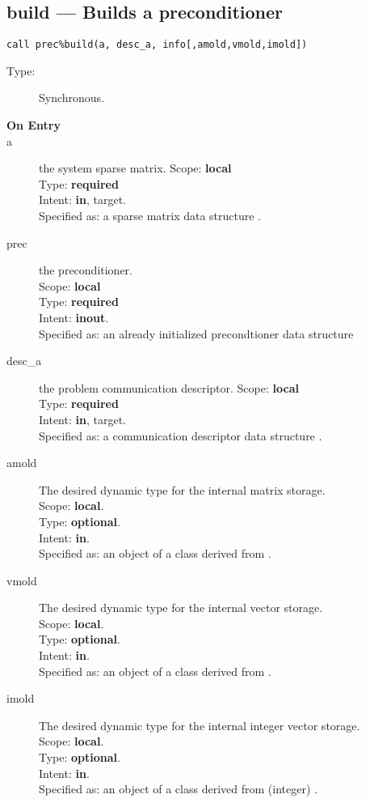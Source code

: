 \clearpage\subsection{build --- Builds a preconditioner}

\begin{verbatim}
call prec%build(a, desc_a, info[,amold,vmold,imold])
\end{verbatim}

\begin{description}
\item[Type:] Synchronous.
\item[\bf On Entry]
\item[a] the system sparse matrix.
Scope: {\bf local} \\
Type: {\bf required}\\
Intent: {\bf in}, target.\\
Specified as: a sparse matrix data structure \spdata.
\item[prec] the preconditioner.\\
Scope: {\bf local} \\
Type: {\bf required}\\
Intent: {\bf inout}.\\
Specified as: an already initialized precondtioner data structure \precdata\\
\item[desc\_a] the problem communication descriptor. 
Scope: {\bf local} \\
Type: {\bf required}\\
Intent: {\bf in}, target.\\
Specified as: a communication descriptor data structure \descdata.
\item[amold] The desired dynamic type for the internal matrix storage.\\
Scope: {\bf local}.\\
Type: {\bf optional}.\\
Intent: {\bf in}.\\
Specified as: an object of a class derived from \spbasedata. 
\item[vmold] The desired dynamic type for the internal vector storage.\\
Scope: {\bf local}.\\
Type: {\bf optional}.\\
Intent: {\bf in}.\\
Specified as: an object of a class derived from \vbasedata. 
\item[imold] The desired dynamic type for the internal integer vector storage.\\
Scope: {\bf local}.\\
Type: {\bf optional}.\\
Intent: {\bf in}.\\
Specified as: an object of a class derived from (integer) \vbasedata. 
\end{description}

